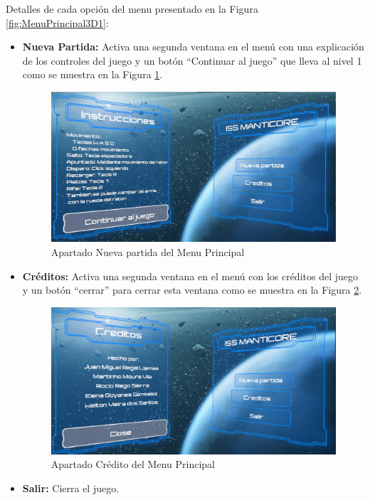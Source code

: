 Detalles de cada opción del menu presentado en la Figura \ref{fig:MenuPrincipal3D1}:
\begin{itemize}
	\item \textbf{Nueva Partida:} Activa una segunda ventana en el menú con una explicación de los controles del juego y un botón ``Continuar al juego'' que lleva al nivel 1 como se muestra en la Figura \ref{fig:MenuPrincipalNuevaPartida}.
	\begin{figure}[H]
		\centering
		\includegraphics[scale=0.40]{imagenes/MenuPrincipalNuevaPartida.png}
		\caption{\label{fig:MenuPrincipalNuevaPartida}Apartado Nueva partida del Menu Principal}
	\end{figure}
	\item \textbf{Créditos:} Activa una segunda ventana en el menú con los créditos del juego y un botón ``cerrar'' para cerrar esta ventana como se muestra en la Figura \ref{fig:MenuPrincipalCreditos}.
	\begin{figure}[H]
		\centering
		\includegraphics[scale=0.35]{imagenes/MenuPrincipalCreditos.png}
		\caption{\label{fig:MenuPrincipalCreditos}Apartado Crédito del Menu Principal}
	\end{figure}
	\item \textbf{Salir:} Cierra el juego.
\end{itemize}


